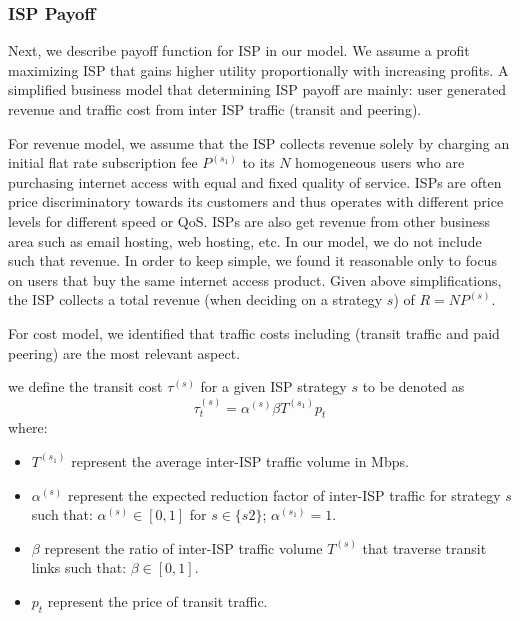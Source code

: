 \documentclass[paper]{ieice}
\begin{document}
\subsubsection{ISP Payoff}
Next, we describe payoff function for ISP in our model.  
We assume a profit maximizing ISP that gains higher utility proportionally with increasing profits. 
A simplified business model that determining ISP payoff are mainly: user generated revenue and traffic cost from inter ISP traffic (transit and peering).

For revenue model, we assume that the ISP collects revenue solely by charging an initial flat rate subscription fee $P^{(s_1)}$ to its $N$ homogeneous users who are purchasing internet access with equal and fixed quality of service.
ISPs are often price discriminatory towards its customers and thus operates with different price levels for different speed or QoS.
ISPs are also get revenue from other business area such as email hosting, web hosting, etc. 
In our model, we do not include such that revenue. 
In order to keep simple, we found it reasonable only to focus on users that buy the same internet access product. 
Given above simplifications, the ISP collects a total revenue (when deciding on a strategy $s$) of $R = N P^{(s)}$.

For cost model, we identified that traffic costs including (transit traffic and paid peering) are the most relevant aspect. 
\newtheorem{theorem3}{Definition}
\begin{theorem}
we define the transit cost $\tau^{(s)}$ for a given ISP strategy $s$ to be denoted as 
\begin{equation}\label{eq:transitcost}
	\tau^{(s)}_t = \alpha^{(s)} \beta T^{(s_1)} p_t
\end{equation}
where:
\begin{itemize}
	\item $T^{(s_1)}$ represent the average inter-ISP traffic volume in Mbps.
	\item $\alpha^{(s)}$ represent the expected reduction factor of inter-ISP traffic for strategy $s$ such that: $\alpha^{(s)} \in [0,1]$ for $s \in \{s2\}$;  $\alpha^{(s_1)} = 1$.
	\item $\beta$ represent the ratio of inter-ISP traffic volume $T^{(s)}$ that traverse transit links such that: $\beta \in [0,1]$.
	\item $p_t$ represent the price of transit traffic.
\end{itemize}
\end{theorem}
\end{document}

